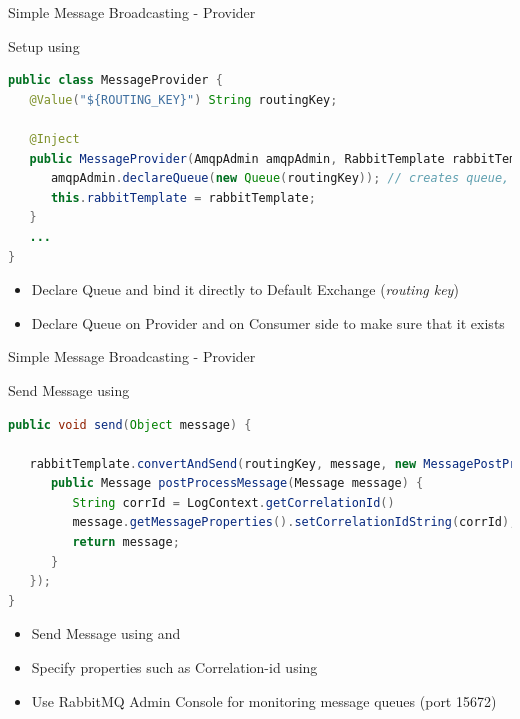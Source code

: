 \begin{frame}[fragile]{Simple Message Broadcasting - Provider}
\small
\begin{block}{Setup using }
\begin{lstlisting}[language=Java,belowskip=-3mm,aboveskip=0mm]
public class MessageProvider {
   @Value("${ROUTING_KEY}") String routingKey;
    
   @Inject 
   public MessageProvider(AmqpAdmin amqpAdmin, RabbitTemplate rabbitTemplate) {
      amqpAdmin.declareQueue(new Queue(routingKey)); // creates queue, if not there
      this.rabbitTemplate = rabbitTemplate;
   }
   ...
}
\end{lstlisting}
\end{block}
\vfill
\begin{itemize}
\item Declare Queue and bind it directly to Default Exchange (\textit{routing key})
\item Declare Queue on Provider and on Consumer side to make sure that it exists
\end{itemize}

\end{frame}

\begin{frame}[fragile]{Simple Message Broadcasting - Provider}
\small
\begin{block}{Send Message using }
\begin{lstlisting}[language=Java,belowskip=-3mm,aboveskip=0mm]
public void send(Object message) {

   rabbitTemplate.convertAndSend(routingKey, message, new MessagePostProcessor() {
      public Message postProcessMessage(Message message) {
         String corrId = LogContext.getCorrelationId()
         message.getMessageProperties().setCorrelationIdString(corrId);
         return message;
      }
   });
}
\end{lstlisting}
\end{block}
\vfill
\begin{itemize}
\item Send Message using  and 
\item Specify properties such as Correlation-id using 
\item Use RabbitMQ Admin Console for monitoring message queues (port 15672)
\end{itemize}
\end{frame}

